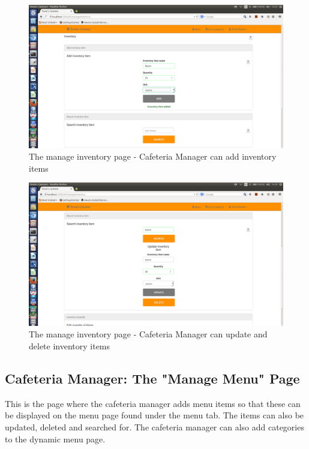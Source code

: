 \documentclass[a4paper,12pt]{report}
\begin{document}
\begin{figure}[H]
  \centering
    \includegraphics[width=1.0\textwidth]{screenshots/addInv.png}
    \caption{The manage inventory page - Cafeteria Manager can add inventory items}
\end{figure}

\begin{figure}[H]
  \centering
    \includegraphics[width=1.0\textwidth]{screenshots/updateInv.png}
    \caption{The manage inventory page - Cafeteria Manager can update and delete inventory items}
\end{figure}

\subsection{Cafeteria Manager: The "Manage Menu" Page}
This is the page where the cafeteria manager adds menu items so that these can be displayed on the menu page found under the menu tab. The items can also be updated, deleted and searched for. The cafeteria manager can also add categories to the dynamic menu page.
\end{document}
